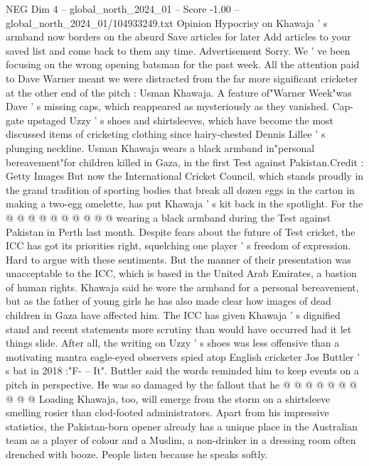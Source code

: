 \begin{textsample}{NEG Dim 4 – global\_north\_2024\_01 – Score -1.00 – global\_north\_2024\_01/104933249.txt}  \label{ex:f4_neg_121}
Opinion Hypocrisy on Khawaja ' s armband now borders on the absurd Save articles for later Add articles to your saved list and come back to them any time.
Advertisement Sorry.
We ' ve been focusing on the wrong opening batsman for the past week.
All the attention paid to Dave Warner meant we were distracted from the far more significant cricketer at the other end of the pitch : Usman Khawaja.
A feature of"Warner Week"was Dave ' s missing caps, which reappeared as mysteriously as they vanished.
Cap-gate upstaged Uzzy ' s shoes and shirtsleeves, which have become the most discussed items of cricketing clothing since hairy-chested Dennis Lillee ' s plunging neckline.
Usman Khawaja wears a black armband in"personal bereavement"for children killed in Gaza, in the first Test against Pakistan.Credit : Getty Images But now the International Cricket Council, which stands proudly in the grand tradition of sporting bodies that break all dozen eggs in the carton in making a two-egg omelette, has put Khawaja ' s kit back in the spotlight.
For the @ @ @ @ @ @ @ @ @ @ wearing a black armband during the Test against Pakistan in Perth last month.
Despite fears about the future of Test cricket, the ICC has got its priorities right, squelching one player ' s freedom of expression.
Hard to argue with these sentiments.
But the manner of their presentation was unacceptable to the ICC, which is based in the United Arab Emirates, a bastion of human rights.
Khawaja said he wore the armband for a personal bereavement, but as the father of young girls he has also made clear how images of dead children in Gaza have affected him.
The ICC has given Khawaja ' s dignified stand and recent statements more scrutiny than would have occurred had it let things slide.
After all, the writing on Uzzy ' s shoes was less offensive than a motivating mantra eagle-eyed observers spied atop English cricketer Jos Buttler ' s bat in 2018 :"F- -- It".
Buttler said the words reminded him to keep events on a pitch in perspective.
He was so damaged by the fallout that he @ @ @ @ @ @ @ @ @ @ Loading Khawaja, too, will emerge from the storm on a shirtsleeve smelling rosier than clod-footed administrators.
Apart from his impressive statistics, the Pakistan-born opener already has a unique place in the Australian team as a player of colour and a Muslim, a non-drinker in a dressing room often drenched with booze.
People listen because he speaks softly.

\end{textsample}
